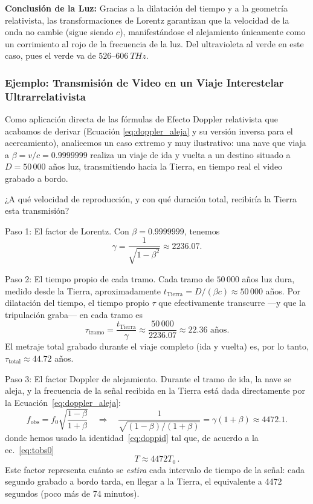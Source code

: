 \documentclass[11pt,a4paper]{book}
\begin{document}
\textbf{Conclusión de la Luz:} Gracias a la dilatación del tiempo y a la geometría relativista, las transformaciones de Lorentz garantizan que la velocidad de la onda no cambie (sigue siendo $c$), manifestándose el alejamiento únicamente como un corrimiento al rojo de la  frecuencia de la luz. Del ultravioleta al verde en este caso, pues el verde va de $526$--$\qty{606}{THz}$.




\subsubsection{Ejemplo: Transmisión de Video en un Viaje Interestelar Ultrarrelativista}

    Como aplicación directa de las fórmulas de Efecto Doppler relativista que acabamos de
derivar (Ecuación \eqref{eq:doppler_aleja} y su versión inversa para el acercamiento), analicemos un caso extremo
y muy ilustrativo: una nave que viaja a $\beta = v/c = 0.9999999$ realiza un viaje de ida y
vuelta a un destino situado a $D = 50\,000$ años luz, transmitiendo hacia la Tierra, en tiempo
real  el video grabado a bordo.

    ¿A qué velocidad de reproducción, y con qué duración total, recibiría la Tierra esta
transmisión?

Paso 1: El factor de Lorentz. Con $\beta = 0.9999999$, tenemos
\begin{equation}
    \gamma = \frac{1}{\sqrt{1-\beta^2}} \approx 2236.07.
\end{equation}

Paso 2: El tiempo propio de cada tramo. Cada tramo de $50\,000$ años luz dura, medido
desde la Tierra, aproximadamente $t_{\text{Tierra}} = D/(\beta c) \approx 50\,000$ años. Por
dilatación del tiempo, el tiempo propio $\tau$ que efectivamente transcurre —y que la
tripulación graba— en cada tramo es
\begin{equation}
    \tau_{\text{tramo}} = \frac{t_{\text{Tierra}}}{\gamma} \approx \frac{50\,000}{2236.07}
    \approx 22.36 \text{ años}.
\end{equation}
El metraje total grabado durante el viaje completo (ida y vuelta) es, por lo tanto,
$\tau_{\text{total}} \approx 44.72$ años.

Paso 3: El factor Doppler de alejamiento. Durante el tramo de ida, la nave se aleja, y la
frecuencia de la señal recibida en la Tierra está dada directamente por la Ecuación~\eqref{eq:doppler_aleja}:
\begin{equation}
    f_{\text{obs}} = f_0\sqrt{\frac{1-\beta}{1+\beta}} \quad\Longrightarrow\quad
    \frac{1}{\sqrt{(1-\beta)/(1+\beta)}} = \gamma(1+\beta) \approx 4472.1.
\end{equation}
donde hemos usado la identidad~\eqref{eq:doppid} tal que, de acuerdo a la ec.~\eqref{eq:tobs0}
\begin{equation}
    T\approx 4472 T_0\,.
\end{equation}
Este factor representa cuánto se \textit{estira} cada intervalo de tiempo de la señal: cada
segundo grabado a bordo tarda, en llegar a la Tierra, el equivalente a 4472 segundos (poco
más de 74 minutos).
\end{document}
